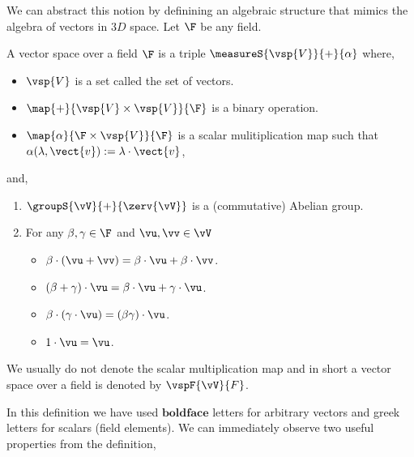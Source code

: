 We can abstract this notion by definining an algebraic structure that mimics the algebra of vectors in $3D$
space. Let $\F$ be any field.
\begin{Definition}
    A vector space over a field $\F$ is a triple $\measureS{\vsp{V}}{+}{\alpha}$ where,
    \begin{itemize}
	\item
	    $\vsp{V}$ is a set called the set of vectors.
	\item
	    $\map{+}{\vsp{V}\times\vsp{V}}{\F}$ is a binary operation.
	\item
	    $\map{\alpha}{\F\times\vsp{V}}{\F}$ is a scalar mulitiplication map such that
	    $\alpha(\lambda,\vect{v}) := \lambda\cdot\vect{v}$,
    \end{itemize}
    and,
    \begin{enumerate}
	\item
	    $\groupS{\vV}{+}{\zerv{\vV}}$ is a (commutative) Abelian group.
	\item For any $\beta,\gamma \in \F$ and $\vu,\vv \in \vV$
	    \begin{itemize}
		\item
		    $\beta\cdot(\vu + \vv) = \beta\cdot\vu + \beta\cdot\vv$.
		\item
		    $(\beta + \gamma)\cdot\vu = \beta\cdot\vu + \gamma\cdot\vu$.
		\item
		    $\beta\cdot(\gamma\cdot\vu) = (\beta\gamma)\cdot\vu$.
		\item
		    $1\cdot\vu = \vu$.
	    \end{itemize}
    \end{enumerate}
    We usually do not denote the scalar multiplication map and in short a vector space over a field is denoted
    by $\vspF{\vV}{F}$.
\end{Definition}
In this definition we have used $\textbf{boldface}$ letters for arbitrary vectors and greek letters for
scalars (field elements). We can immediately observe two useful properties from the definition,
